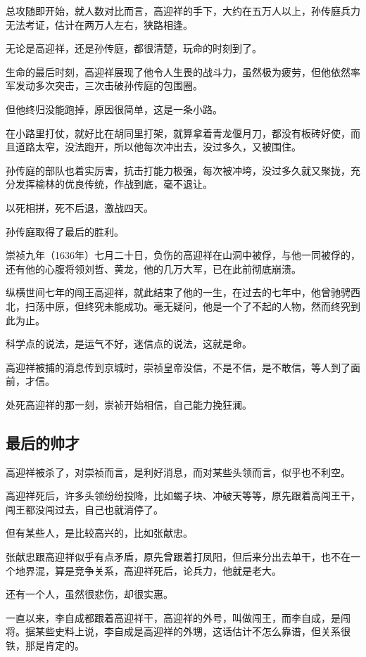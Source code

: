 \begin{multicols}{\theparacolNo}
		总攻随即开始，就人数对比而言，高迎祥的手下，大约在五万人以上，孙传庭兵力无法考证，估计在两万人左右，狭路相逢。

		无论是高迎祥，还是孙传庭，都很清楚，玩命的时刻到了。

		生命的最后时刻，高迎祥展现了他令人生畏的战斗力，虽然极为疲劳，但他依然率军发动多次突击，三次击破孙传庭的包围圈。

		但他终归没能跑掉，原因很简单，这是一条小路。

		在小路里打仗，就好比在胡同里打架，就算拿着青龙偃月刀，都没有板砖好使，而且道路太窄，没法跑开，所以他每次冲出去，没过多久，又被围住。

		孙传庭的部队也着实厉害，抗击打能力极强，每次被冲垮，没过多久就又聚拢，充分发挥榆林的优良传统，作战到底，毫不退让。

		以死相拼，死不后退，激战四天。

		孙传庭取得了最后的胜利。

		崇祯九年（1636年）七月二十日，负伤的高迎祥在山洞中被俘，与他一同被俘的，还有他的心腹将领刘哲、黄龙，他的几万大军，已在此前彻底崩溃。

		纵横世间七年的闯王高迎祥，就此结束了他的一生，在过去的七年中，他曾驰骋西北，扫荡中原，但终究未能成功。毫无疑问，他是一个了不起的人物，然而终究到此为止。

		科学点的说法，是运气不好，迷信点的说法，这就是命。

		高迎祥被捕的消息传到京城时，崇祯皇帝没信，不是不信，是不敢信，等人到了面前，才信。

		处死高迎祥的那一刻，崇祯开始相信，自己能力挽狂澜。

		\subsection{最后的帅才}
		高迎祥被杀了，对崇祯而言，是利好消息，而对某些头领而言，似乎也不利空。

		高迎祥死后，许多头领纷纷投降，比如蝎子块、冲破天等等，原先跟着高闯王干，闯王都没闯过去，自己也就消停了。

		但有某些人，是比较高兴的，比如张献忠。

		张献忠跟高迎祥似乎有点矛盾，原先曾跟着打凤阳，但后来分出去单干，也不在一个地界混，算是竞争关系，高迎祥死后，论兵力，他就是老大。

		还有一个人，虽然很悲伤，却很实惠。

		一直以来，李自成都跟着高迎祥干，高迎祥的外号，叫做闯王，而李自成，是闯将。据某些史料上说，李自成是高迎祥的外甥，这话估计不怎么靠谱，但关系很铁，那是肯定的。


\end{multicols}
